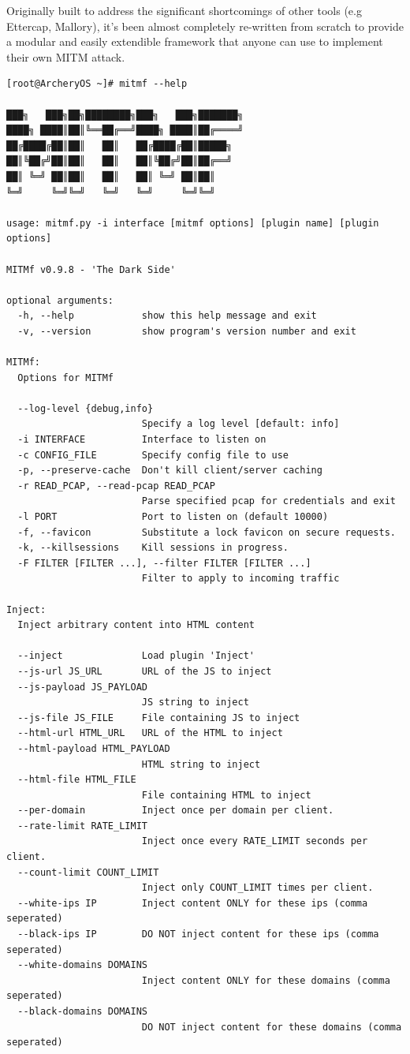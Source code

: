 \documentclass{article}
\begin{document}
Originally built to address the significant shortcomings of other tools (e.g Ettercap, Mallory), it's been almost completely re-written from scratch to provide a modular and easily extendible framework that anyone can use to implement their own MITM attack.
\begin{lstlisting}
[root@ArcheryOS ~]# mitmf --help

███╗   ███╗██╗████████╗███╗   ███╗███████╗
████╗ ████║██║╚══██╔══╝████╗ ████║██╔════╝
██╔████╔██║██║   ██║   ██╔████╔██║█████╗  
██║╚██╔╝██║██║   ██║   ██║╚██╔╝██║██╔══╝  
██║ ╚═╝ ██║██║   ██║   ██║ ╚═╝ ██║██║     
╚═╝     ╚═╝╚═╝   ╚═╝   ╚═╝     ╚═╝╚═╝     

usage: mitmf.py -i interface [mitmf options] [plugin name] [plugin options]

MITMf v0.9.8 - 'The Dark Side'

optional arguments:
  -h, --help            show this help message and exit
  -v, --version         show program's version number and exit

MITMf:
  Options for MITMf

  --log-level {debug,info}
                        Specify a log level [default: info]
  -i INTERFACE          Interface to listen on
  -c CONFIG_FILE        Specify config file to use
  -p, --preserve-cache  Don't kill client/server caching
  -r READ_PCAP, --read-pcap READ_PCAP
                        Parse specified pcap for credentials and exit
  -l PORT               Port to listen on (default 10000)
  -f, --favicon         Substitute a lock favicon on secure requests.
  -k, --killsessions    Kill sessions in progress.
  -F FILTER [FILTER ...], --filter FILTER [FILTER ...]
                        Filter to apply to incoming traffic

Inject:
  Inject arbitrary content into HTML content

  --inject              Load plugin 'Inject'
  --js-url JS_URL       URL of the JS to inject
  --js-payload JS_PAYLOAD
                        JS string to inject
  --js-file JS_FILE     File containing JS to inject
  --html-url HTML_URL   URL of the HTML to inject
  --html-payload HTML_PAYLOAD
                        HTML string to inject
  --html-file HTML_FILE
                        File containing HTML to inject
  --per-domain          Inject once per domain per client.
  --rate-limit RATE_LIMIT
                        Inject once every RATE_LIMIT seconds per client.
  --count-limit COUNT_LIMIT
                        Inject only COUNT_LIMIT times per client.
  --white-ips IP        Inject content ONLY for these ips (comma seperated)
  --black-ips IP        DO NOT inject content for these ips (comma seperated)
  --white-domains DOMAINS
                        Inject content ONLY for these domains (comma seperated)
  --black-domains DOMAINS
                        DO NOT inject content for these domains (comma seperated)


\end{lstlisting}
\end{document}
